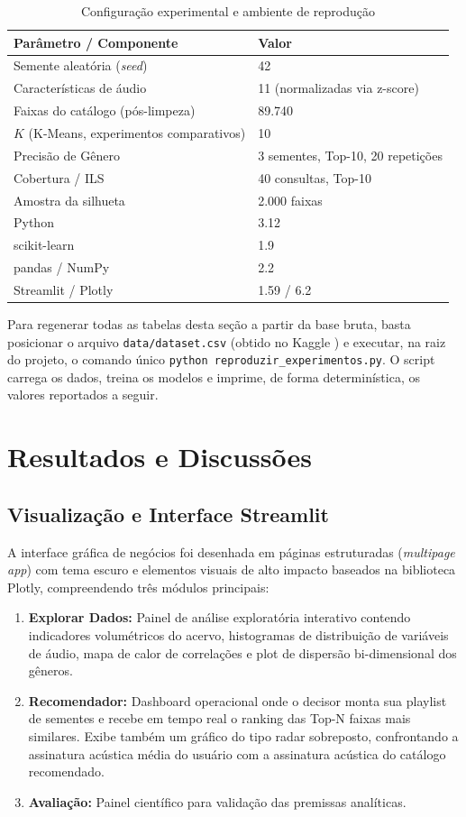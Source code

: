 \documentclass[12pt]{article}
\begin{document}
\begin{table}[H]
\centering
\caption{Configuração experimental e ambiente de reprodução}
\label{tab:hiperparametros}
\begin{tabular}{ll}
\toprule
\textbf{Parâmetro / Componente} & \textbf{Valor} \\
\midrule
Semente aleatória (\textit{seed}) & 42 \\
Características de áudio & 11 (normalizadas via z-score) \\
Faixas do catálogo (pós-limpeza) & 89.740 \\
$K$ (K-Means, experimentos comparativos) & 10 \\
Precisão de Gênero & 3 sementes, Top-10, 20 repetições \\
Cobertura / ILS & 40 consultas, Top-10 \\
Amostra da silhueta & 2.000 faixas \\
\midrule
Python & 3.12 \\
scikit-learn & 1.9 \\
pandas / NumPy & 2.2 \\
Streamlit / Plotly & 1.59 / 6.2 \\
\bottomrule
\end{tabular}
\end{table}

Para regenerar todas as tabelas desta seção a partir da base bruta, basta posicionar o arquivo \texttt{data/dataset.csv} (obtido no Kaggle \cite{spotify_dataset}) e executar, na raiz do projeto, o comando único \texttt{python reproduzir\_experimentos.py}. O script carrega os dados, treina os modelos e imprime, de forma determinística, os valores reportados a seguir.

\section{Resultados e Discussões}
\label{sec:resultados}
\subsection{Visualização e Interface Streamlit}
A interface gráfica de negócios foi desenhada em páginas estruturadas (\textit{multipage app}) com tema escuro e elementos visuais de alto impacto baseados na biblioteca Plotly, compreendendo três módulos principais:
\begin{enumerate}
    \item \textbf{Explorar Dados:} Painel de análise exploratória interativo contendo indicadores volumétricos do acervo, histogramas de distribuição de variáveis de áudio, mapa de calor de correlações e plot de dispersão bi-dimensional dos gêneros.
    \item \textbf{Recomendador:} Dashboard operacional onde o decisor monta sua playlist de sementes e recebe em tempo real o ranking das Top-N faixas mais similares. Exibe também um gráfico do tipo radar sobreposto, confrontando a assinatura acústica média do usuário com a assinatura acústica do catálogo recomendado.
    \item \textbf{Avaliação:} Painel científico para validação das premissas analíticas.
\end{enumerate}
\end{document}

